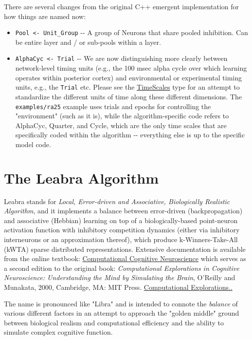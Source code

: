 There are several changes from the original C++ emergent implementation
for how things are named now:

\begin{itemize}
\tightlist
\item
  \texttt{Pool\ \textless{}-\ Unit\_Group} -\/- A group of Neurons that
  share pooled inhibition. Can be entire layer and / or sub-pools within
  a layer.
\item
  \texttt{AlphaCyc\ \textless{}-\ Trial} -\/- We are now distinguishing
  more clearly between network-level timing units (e.g., the 100 msec
  alpha cycle over which learning operates within posterior cortex) and
  environmental or experimental timing units, e.g., the \texttt{Trial}
  etc. Please see the
  \href{https://godoc.org/github.com/emer/leabra/leabra\#TimeScales}{TimeScales}
  type for an attempt to standardize the different units of time along
  these different dimensions. The \texttt{examples/ra25} example uses
  trials and epochs for controlling the "environment" (such as it is),
  while the algorithm-specific code refers to AlphaCyc, Quarter, and
  Cycle, which are the only time scales that are specifically coded
  within the algorithm -\/- everything else is up to the specific model
  code.
\end{itemize}

\hypertarget{the-leabra-algorithm}{%
\section{The Leabra Algorithm}\label{the-leabra-algorithm}}

Leabra stands for \emph{Local, Error-driven and Associative,
Biologically Realistic Algorithm}, and it implements a balance between
error-driven (backpropagation) and associative (Hebbian) learning on top
of a biologically-based point-neuron activation function with inhibitory
competition dynamics (either via inhibitory interneurons or an
approximation thereof), which produce k-Winners-Take-All (kWTA) sparse
distributed representations. Extensive documentation is available from
the online textbook: \href{https://CompCogNeuro.org}{Computational
Cognitive Neuroscience} which serves as a second edition to the original
book: \emph{Computational Explorations in Cognitive Neuroscience:
Understanding the Mind by Simulating the Brain}, O'Reilly and Munakata,
2000, Cambridge, MA: MIT Press.
\href{http://psych.colorado.edu/~oreilly/comp_ex_cog_neuro.html}{Computational
Explorations..}

The name is pronounced like "Libra" and is intended to connote the
\emph{balance} of various different factors in an attempt to approach
the "golden middle" ground between biological realism and computational
efficiency and the ability to simulate complex cognitive function.

